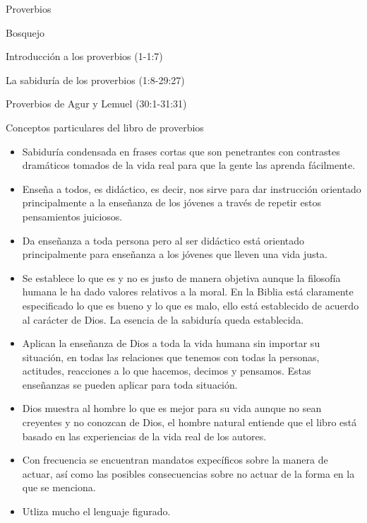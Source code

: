 \begin{section}{Proverbios}
\begin{itemize}
	\end{itemize}
	\begin{subsection}{Bosquejo}
		\begin{subsubsection}{Introducción a los proverbios (1-1:7)}
			\end{subsubsection}
			\begin{subsubsection}{La sabiduría de los proverbios (1:8-29:27)}
			\end{subsubsection}
			\begin{subsubsection}{Proverbios de Agur y Lemuel (30:1-31:31)}
			\end{subsubsection}
			\begin{subsubsection}{Conceptos particulares del libro de proverbios}
				\begin{itemize}
					\item Sabiduría condensada en frases cortas que son penetrantes con contrastes dramáticos tomados de la vida real para que la gente las aprenda fácilmente. 
					\item Enseña a todos, es didáctico, es decir, nos sirve para dar instrucción orientado principalmente a la enseñanza de los jóvenes a través de repetir estos pensamientos juiciosos.
					\item Da enseñanza a toda persona pero al ser didáctico está orientado principalmente para enseñanza a los jóvenes que lleven una vida justa.
					\item Se establece lo que es y no es justo de manera objetiva aunque la filosofía humana le ha dado valores relativos a la moral. En la Biblia está claramente especificado lo que es bueno y lo que es malo, ello está establecido de acuerdo al carácter de Dios. La esencia de la sabiduría queda establecida.
					\item Aplican la enseñanza de Dios a toda la vida humana sin importar su situación, en todas las relaciones que tenemos con todas la personas, actitudes, reacciones a lo que hacemos, decimos y pensamos. Estas enseñanzas se pueden aplicar para toda situación.
					\item Dios muestra al hombre lo que es mejor para su vida aunque no sean creyentes y no conozcan de Dios, el hombre natural entiende que el libro está basado en las experiencias de la vida real de los autores. 
					\item Con frecuencia se encuentran mandatos expecíficos sobre la manera de actuar, así como las posibles consecuencias sobre no actuar de la forma en la que se menciona.
					\item Utliza mucho el lenguaje figurado. 

\end{itemize}
\end{subsubsection}
\end{subsection}
\end{section}
